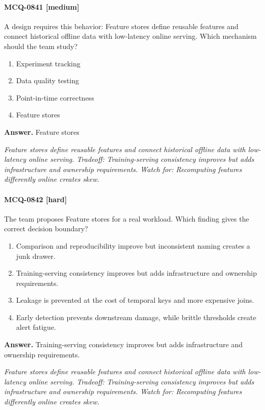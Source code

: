 \paragraph{MCQ-0841 [medium]} A design requires this behavior: Feature stores define reusable features and connect historical offline data with low-latency online serving. Which mechanism should the team study?
\begin{enumerate}[label=\Alph*.]
\item Experiment tracking
\item Data quality testing
\item Point-in-time correctness
\item Feature stores
\end{enumerate}
\noindent\textbf{Answer.} Feature stores
\par\textit{Feature stores define reusable features and connect historical offline data with low-latency online serving. Tradeoff: Training-serving consistency improves but adds infrastructure and ownership requirements. Watch for: Recomputing features differently online creates skew.}
\paragraph{MCQ-0842 [hard]} The team proposes Feature stores for a real workload. Which finding gives the correct decision boundary?
\begin{enumerate}[label=\Alph*.]
\item Comparison and reproducibility improve but inconsistent naming creates a junk drawer.
\item Training-serving consistency improves but adds infrastructure and ownership requirements.
\item Leakage is prevented at the cost of temporal keys and more expensive joins.
\item Early detection prevents downstream damage, while brittle thresholds create alert fatigue.
\end{enumerate}
\noindent\textbf{Answer.} Training-serving consistency improves but adds infrastructure and ownership requirements.
\par\textit{Feature stores define reusable features and connect historical offline data with low-latency online serving. Tradeoff: Training-serving consistency improves but adds infrastructure and ownership requirements. Watch for: Recomputing features differently online creates skew.}
